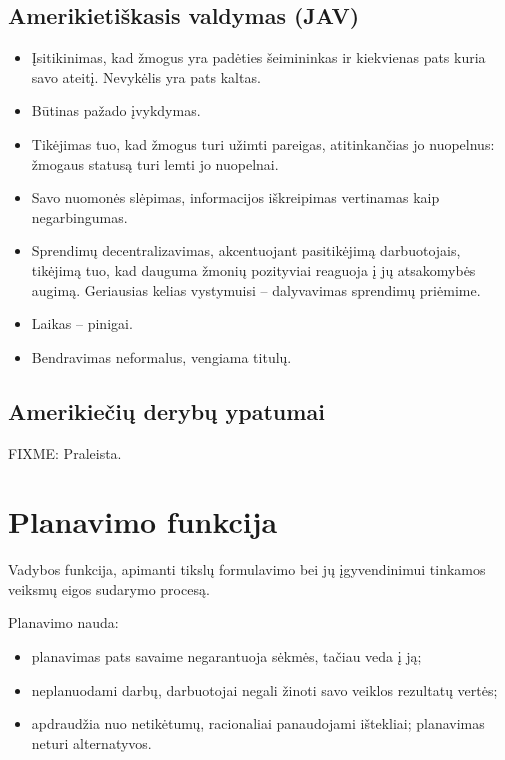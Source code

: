 \section{Amerikietiškasis valdymas (JAV)}

\begin{itemize}
  \item Įsitikinimas, kad žmogus yra padėties šeimininkas ir kiekvienas
    pats kuria savo ateitį. Nevykėlis yra pats kaltas.
  \item Būtinas pažado įvykdymas.
  \item Tikėjimas tuo, kad žmogus turi užimti pareigas, atitinkančias
    jo nuopelnus: žmogaus statusą turi lemti jo nuopelnai.
  \item Savo nuomonės slėpimas, informacijos iškreipimas vertinamas
    kaip negarbingumas.
  \item Sprendimų decentralizavimas, akcentuojant pasitikėjimą
    darbuotojais, tikėjimą tuo, kad dauguma žmonių pozityviai reaguoja
    į jų atsakomybės augimą. Geriausias kelias vystymuisi – dalyvavimas
    sprendimų priėmime.
  \item Laikas – pinigai.
  \item Bendravimas neformalus, vengiama titulų.
\end{itemize}

\section{Amerikiečių derybų ypatumai}

FIXME: Praleista.

\chapter{Planavimo funkcija}

\begin{defn}[Planavimas]
  Vadybos funkcija, apimanti tikslų formulavimo bei jų įgyvendinimui
  tinkamos veiksmų eigos sudarymo procesą.
\end{defn}

Planavimo nauda:
\begin{itemize}
  \item planavimas pats savaime negarantuoja sėkmės, tačiau veda į ją;
  \item neplanuodami darbų, darbuotojai negali žinoti savo veiklos
    rezultatų vertės;
  \item apdraudžia nuo netikėtumų, racionaliai panaudojami ištekliai;
    planavimas neturi alternatyvos. %
\end{itemize}

